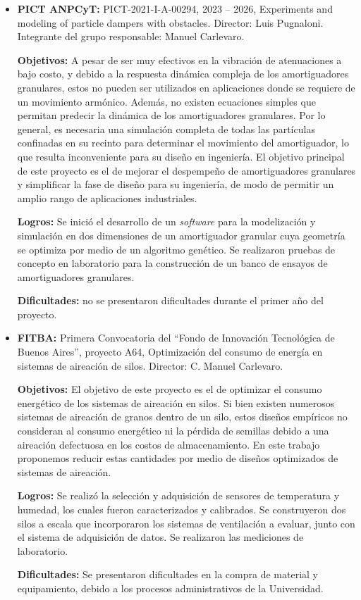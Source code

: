 \documentclass[a4paper,11pt,twoside,final,titlepage,onecolumn,openright]{report}
\begin{document}
\begin{itemize}
 {\bf Dificultades:} no se produjeron dificultades en el desarrollo del proyecto.

\item \textbf{PICT ANPCyT:} PICT-2021-I-A-00294, 2023 -- 2026, Experiments and modeling of particle dampers with obstacles. Director: Luis Pugnaloni. Integrante del grupo responsable: Manuel Carlevaro.

    \textbf{Objetivos:} A pesar de ser muy efectivos en la vibración de atenuaciones a bajo costo, y debido a la respuesta dinámica compleja de los amortiguadores granulares, estos no pueden ser utilizados en aplicaciones donde se requiere de un movimiento armónico. Además, no existen ecuaciones simples que permitan predecir la dinámica de los amortiguadores granulares. Por lo general, es necesaria una simulación completa de todas las partículas confinadas en su recinto para determinar el movimiento del amortiguador, lo que resulta inconveniente para su diseño en ingeniería. El objetivo principal de este proyecto es el de mejorar el despempeño de amortiguadores granulares y simplificar la fase de diseño para su ingeniería, de modo de permitir un amplio rango de aplicaciones industriales.

    \textbf{Logros: } Se inició el desarrollo de un \textit{software} para la modelización y simulación en dos dimensiones de un amortiguador granular cuya geometría se optimiza por medio de un algoritmo genético. Se realizaron pruebas de concepto en laboratorio para la construcción de un banco de ensayos de amortiguadores granulares.

\textbf{Dificultades:} no se presentaron dificultades durante el primer año del proyecto.

\item \textbf{FITBA:} Primera Convocatoria del ``Fondo de Innovación Tecnológica de Buenos Aires'', proyecto A64, Optimización del consumo de energía en sistemas de aireación de silos. Director: C. Manuel Carlevaro.

\textbf{Objetivos:} El objetivo de este proyecto es el de optimizar el consumo energético de los sistemas de aireación en silos. Si bien existen numerosos sistemas de aireación de granos dentro de un silo, estos diseños empíricos no consideran al consumo energético ni la pérdida de semillas debido a una aireación defectuosa en los costos de almacenamiento. En este trabajo proponemos reducir estas cantidades por medio de diseños optimizados de sistemas de aireación.

    \textbf{Logros: } Se realizó la selección y adquisición de sensores de temperatura y humedad, los cuales fueron caracterizados y calibrados. Se construyeron dos silos a escala que incorporaron los sistemas de ventilación a evaluar, junto con el sistema de adquisición de datos. Se realizaron las mediciones de laboratorio. 

\textbf{Dificultades:} Se presentaron dificultades en la compra de material y equipamiento, debido a los procesos administrativos de la Universidad. 

\end{itemize}
\end{document}
